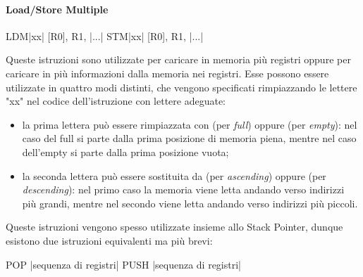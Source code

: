 \paragraph*{Load/Store Multiple}
\begin{ARMcode}
    LDM|xx| [R0], {R1, |...|}
    STM|xx| [R0], {R1, |...|}
\end{ARMcode}
Queste istruzioni sono utilizzate per caricare in memoria più registri oppure per caricare in più informazioni dalla memoria nei registri. Esse possono essere utilizzate in quattro modi distinti, che vengono specificati rimpiazzando le lettere "xx" nel codice dell'istruzione con lettere adeguate:
\begin{itemize}
    \item la prima lettera può essere rimpiazzata con  (per \emph{full}) oppure  (per \emph{empty}): nel caso del full si parte dalla prima posizione di memoria piena, mentre nel caso dell'empty si parte dalla prima posizione vuota;
    \item la seconda lettera può essere sostituita da  (per \emph{ascending}) oppure  (per \emph{descending}): nel primo caso la memoria viene letta andando verso indirizzi più grandi, mentre nel secondo viene letta andando verso indirizzi più piccoli.
\end{itemize}

Queste istruzioni vengono spesso utilizzate insieme allo Stack Pointer, dunque esistono due istruzioni equivalenti ma più brevi:
\begin{ARMcode}
    POP  {|sequenza di registri|}
    PUSH {|sequenza di registri|}
\end{ARMcode}